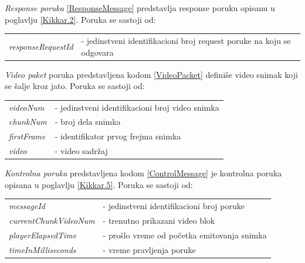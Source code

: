 \documentclass[12pt,oneside]{memoir}
\begin{document}


\textit{Response poruka} \ref{ResponseMessage} predstavlja response poruku opisanu u poglavlju \ref{Kikkar.2}. Poruka se sastoji od:
 
\begin{center}
\begin{tabular}{ p{4cm} p{10cm} }
 \textit{responseRequestId} & - jedinstveni identifikacioni broj request poruke na koju se odgovara \\ 
\end{tabular}
\end{center}




\textit{Video paket} poruka predstavljena kodom \ref{VideoPacket} definiše video snimak koji se šalje kroz jato. Poruka se sastoji od:
 
\begin{center}
\begin{tabular}{ p{4cm} p{10cm} }
 \textit{videoNum} & - jedinstveni identifikacioni broj video snimka \\ 
 \textit{chunkNum} & - broj dela snimka \\ 
 \textit{firstFrame} & - identifikator prvog frejma snimka \\ 
 \textit{video} & - video sadržaj \\ 
\end{tabular}
\end{center}




\textit{Kontrolna poruka} predstavljena kodom \ref{ControlMessage} je kontrolna poruka opisana u poglavlju \ref{Kikkar.5}. Poruka se sastoji od:
 
\begin{center}
\begin{tabular}{ p{4.5cm} p{9.5cm} }
 \textit{messageId} & - jedinstveni identifikacioni broj poruke \\ 
 \textit{currentChunkVideoNum} & - trenutno prikazani video blok \\ 
 \textit{playerElapsedTime} & - prošlo vreme od početka emitovanja snimka \\ 
 \textit{timeInMilliseconds} & - vreme pravljenja poruke \\ 
\end{tabular}
\end{center}
\end{document}
